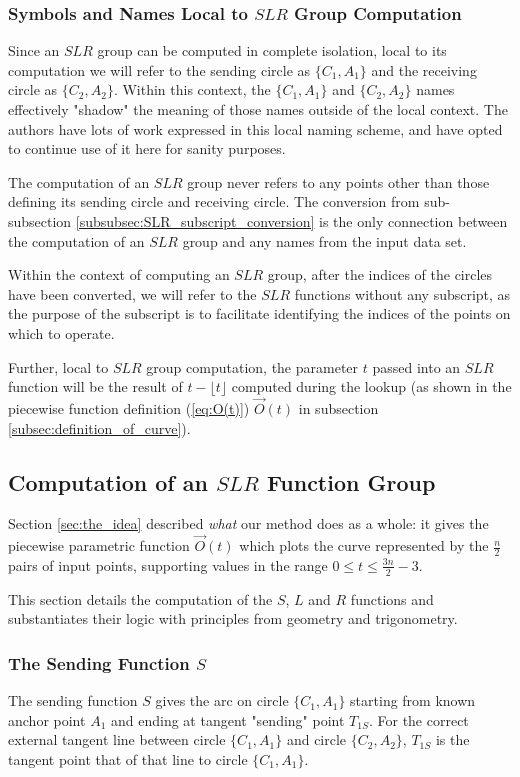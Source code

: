 \documentclass{article}
\begin{document}
\subsubsection{Symbols and Names Local to $SLR$ Group Computation}
\label{subsub:local_point_indices}
Since an $SLR$ group can be computed in complete isolation, local to its computation we will refer to the sending circle as $\{C_1, A_1\}$ and the receiving circle as $\{C_2, A_2\}$. Within this context, the $\{C_1, A_1\}$ and $\{C_2, A_2\}$ names effectively "shadow" the meaning of those names outside of the local context. The authors have lots of work expressed in this local naming scheme, and have opted to continue use of it here for sanity purposes. 

The computation of an $SLR$ group never refers to any points other than those defining its sending circle and receiving circle. The conversion from sub-subsection \ref{subsubsec:SLR_subscript_conversion} is the only connection between the computation of an $SLR$ group and any names from the input data set.

Within the context of computing an $SLR$ group, after the indices of the circles have been converted, we will refer to the $SLR$ functions without any subscript, as the purpose of the subscript is to facilitate identifying the indices of the points on which to operate.

Further, local to $SLR$ group computation, the parameter $t$ passed into an $SLR$ function will be the result of $t - \lfloor t \rfloor$ computed during the lookup (as shown in the piecewise function definition (\ref{eq:O(t)}) $\overrightarrow{O}(t)$ in subsection \ref{subsec:definition_of_curve}).

\subsection{Computation of an $SLR$ Function Group}
\label{subsec:SLR_group_computation}
Section \ref{sec:the_idea} described \textit{what} our method does as a whole: it gives the piecewise parametric function $\overrightarrow{O}(t)$ which plots the curve represented by the $\frac{n}{2}$ pairs of input points, supporting values in the range $0 \leq t \leq \frac{3n}{2}-3$.

This section details the computation of the $S$, $L$ and $R$ functions and substantiates their logic with principles from geometry and trigonometry.

\subsubsection{The Sending Function $S$}
\label{subsubsec:sending_function_S}
The sending function $S$ gives the arc on circle $\{C_1, A_1\}$ starting from known anchor point $A_1$ and ending at tangent "sending" point $T_{1S}$. For the correct external tangent line between circle $\{C_1, A_1\}$ and circle $\{C_2, A_2\}$, $T_{1S}$ is the tangent point that of that line to circle $\{C_1, A_1\}$.
\end{document}
